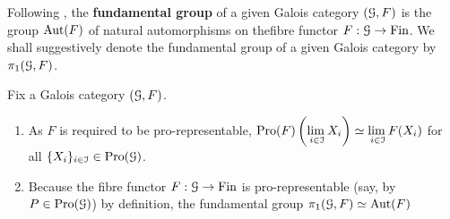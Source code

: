         \begin{definition} \label{def: fundamental_groups_of_galois_categories}
            Following \cite[Theorem 2.16]{noohi_fundamental_group}, the \textbf{fundamental group} of a given Galois category $(\mathcal{G}, F)$ is the group $\mathrm{Aut}(F)$ of natural automorphisms on thefibre functor $F: \mathcal{G} \to \mathrm{Fin}$. We shall suggestively denote the fundamental group of a given Galois category by $\pi_1(\mathcal{G}, F)$.
        \end{definition}
        \begin{remark} \label{remark: basic_properties_of_galois_categories}
            Fix a Galois category $(\mathcal{G}, F)$.
            \begin{enumerate}
                \item As $F$ is required to be pro-representable, $\mathrm{Pro}(F)\left(\underset{i \in \mathcal{I}}{\operatorname{lim} \:} X_i\right) \simeq \underset{i \in \mathcal{I}}{\operatorname{lim} \:} F(X_i)$ for all $\{X_i\}_{i \in \mathcal{I}} \in \mathrm{Pro}(\mathcal{G})$.
                \item Because the fibre functor $F: \mathcal{G} \to \mathrm{Fin}$ is pro-representable (say, by $P \in \mathrm{Pro}(\mathcal{G})$) by definition, the fundamental group $\pi_1(\mathcal{G}, F) \simeq \mathrm{Aut}(F)$
            \end{enumerate}
        \end{remark}
        
